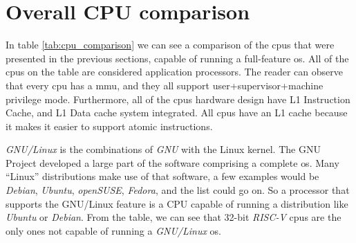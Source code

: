 \section{Overall CPU comparison}
\label{section:cpu_comparison}
In table \ref*{tab:cpu_comparison} we can see a comparison of the \acrshort{cpu}s that were presented in the previous sections, capable of running a full-feature \acrfull{os}. All of the \acrshort{cpu}s on the table are considered application processors. The reader can observe that every \acrshort{cpu} has a \acrfull{mmu}, and they all support \acrshort{user}+\acrshort{supervisor}+\acrshort{machine} privilege mode. Furthermore, all of the \acrshort{cpu}s hardware design have L1 Instruction Cache, and L1 Data cache system integrated. All \acrshort{cpu}s have an L1 cache because it makes it easier to support atomic instructions.

\textit{GNU/Linux} is the combinations of \textit{GNU} with the Linux kernel. The GNU Project developed a large part of the software comprising a complete \acrfull{os}. Many \enquote{Linux} distributions make use of that software, a few examples would be \textit{Debian}, \textit{Ubuntu}, \textit{openSUSE}, \textit{Fedora}, and the list could go on. So a processor that supports the GNU/Linux feature is a CPU capable of running a distribution like \textit{Ubuntu} or \textit{Debian}. From the table, we can see that 32-bit \textit{RISC-V} \acrshort{cpu}s are the only ones not capable of running a \textit{GNU/Linux} \acrfull{os}.

